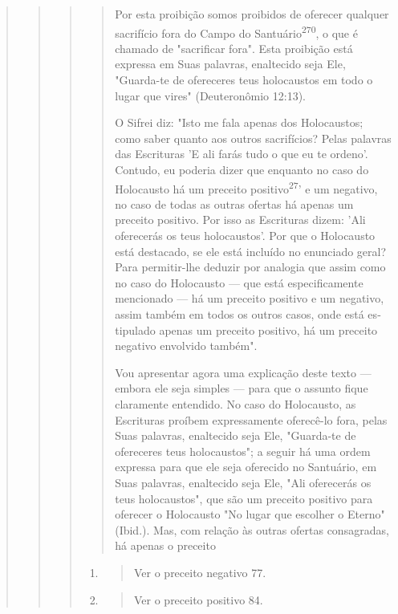 \begin{quote}
\begin{quote}
\begin{quote}
\begin{quote}
Por esta proibição somos proibidos de oferecer qualquer sacrifício fora
do Campo do Santuário\textsuperscript{270}, o que é chamado de
"sacrificar fora". Esta proibição está expressa em Suas palavras,
enaltecido seja Ele, "Guarda-te de ofe­receres teus holocaustos em todo
o lugar que vires" (Deuteronômio 12:13).

O Sifrei diz: "Isto me fala apenas dos Holocaustos; como saber quanto
aos outros sacrifícios? Pelas palavras das Escrituras 'E ali farás tudo
o que eu te ordeno'. Contudo, eu poderia dizer que enquanto no caso do
Holocausto há um preceito positivo\textsuperscript{27}' e um negativo,
no caso de todas as outras ofertas há apenas um preceito positivo. Por
isso as Escrituras dizem: 'Ali oferecerás os teus holocaustos'. Por que
o Holocausto está destacado, se ele está incluído no enunciado geral?
Para permitir-lhe deduzir por analogia que assim como no ca­so do
Holocausto --- que está especificamente mencionado --- há um preceito
positivo e um negativo, assim também em todos os outros casos, onde está
es­tipulado apenas um preceito positivo, há um preceito negativo
envolvido também".

Vou apresentar agora uma explicação deste texto --- embora ele seja
simples --- para que o assunto fique claramente entendido. No caso do
Holo­causto, as Escrituras proíbem expressamente oferecê-lo fora, pelas
Suas pala­vras, enaltecido seja Ele, "Guarda-te de ofereceres teus
holocaustos"; a seguir há uma ordem expressa para que ele seja oferecido
no Santuário, em Suas pala­vras, enaltecido seja Ele, "Ali oferecerás os
teus holocaustos", que são um pre­ceito positivo para oferecer o
Holocausto "No lugar que escolher o Eterno" (Ibid.). Mas, com relação às
outras ofertas consagradas, há apenas o preceito
\end{quote}

\begin{enumerate}
\def\labelenumi{\arabic{enumi}.}
\setcounter{enumi}{269}
\item
 \begin{quote}
 Ver o preceito negativo 77.
 \end{quote}
\item
 \begin{quote}
 Ver o preceito positivo 84.
 \end{quote}
\end{enumerate}

\begin{quote}


\end{quote}
\end{quote}
\end{quote}
\end{quote}
